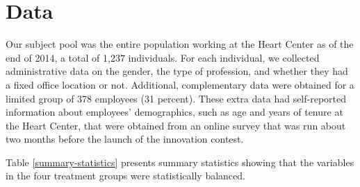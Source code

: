 \documentclass[12pt, titlepage]{article}
\begin{document}
\section{Data}\label{data}

Our subject pool was the entire population working at the Heart Center
as of the end of 2014, a total of 1,237 individuals. For each
individual, we collected administrative data on the gender, the type of
profession, and whether they had a fixed office location or not.
Additional, complementary data were obtained for a limited group of 378
employees (31 percent). These extra data had self-reported information
about employees' demographics, such as age and years of tenure at the
Heart Center, that were obtained from an online survey that was run
about two months before the launch of the innovation contest.

Table \ref{summary-statistics} presents summary statistics showing that
the variables in the four treatment groups were statistically balanced.
\end{document}
